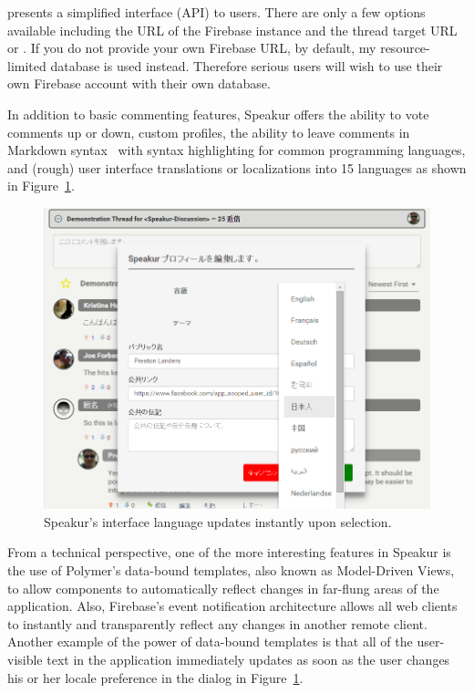  presents a simplified interface (API) to users.
There are only a few options available including the URL of the Firebase instance and the thread target URL or .
If you do not provide your own Firebase URL, by default, my resource-limited database is used instead.
Therefore serious users will wish to use their own Firebase account with their own database.

In addition to basic commenting features, Speakur offers the ability to vote comments up or down, custom profiles, 
the ability to leave comments in Markdown syntax~\cite{githubcontributors2015} with syntax highlighting for common programming languages, 
and (rough) user interface translations  or localizations 
into 15 languages as shown in Figure~\ref{f:lang}.

\begin{figure}[htb]
\centering
 \includegraphics[width=\textwidth]{images/screenshot_20150320_1923_lang.png}
\caption{Speakur's interface language updates instantly upon selection.}
\label{f:lang}
\end{figure}

From a technical perspective, one of the more interesting features in Speakur is the use of Polymer's data-bound templates, also known as Model-Driven Views, 
to allow components to automatically reflect changes in far-flung areas of the application.
Also, Firebase's event notification architecture allows all web clients to instantly and transparently reflect any changes in another remote client.
Another example of the power of data-bound templates is that all of the user-visible text in the application immediately updates as soon as the user changes his or her locale preference in the dialog in Figure~\ref{f:lang}.

